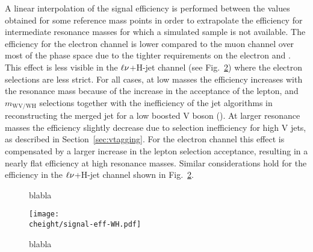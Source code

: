 A linear interpolation of the signal efficiency is performed between the values obtained for some reference mass points in order to extrapolate the efficiency for intermediate resonance masses for which a simulated sample is not available.
The efficiency for the electron channel is lower compared to the muon channel over most of the phase space due to the tighter requirements on the electron \pt and \ETmiss. This effect is less visible in the $\ell\nu$+H-jet channel (see Fig.~\ref{fig:effWH-8TeV}) where the electron selections are less strict. For all cases, at low masses the efficiency increases with the resonance mass because of the increase in the acceptance of the lepton, \ETmiss and $m_\mathrm{WV/WH}$ selections together with the inefficiency of the jet algorithms in reconstructing the merged jet for a low boosted V boson (). At larger resonance masses the efficiency slightly decrease due to \nsubj selection inefficiency for high \pt V jets, as described in Section~\ref{sec:vtagging}.
For the electron channel this effect is compensated by a larger increase in the lepton selection acceptance, resulting in a nearly flat efficiency at high resonance masses.
Similar considerations hold for the efficiency in the $\ell\nu$+H-jet channel shown in Fig.~\ref{fig:effWH-8TeV}.

\begin{figure}[!htb]
\centering
{}
\caption{blabla}
\label{fig:effWV-13TeV}
\end{figure}

\begin{figure}[!htb]
\centering
\texttt{[image: \\cheight/signal-eff-WH.pdf]}
\caption{blabla}
\label{fig:effWH-8TeV}
\end{figure}